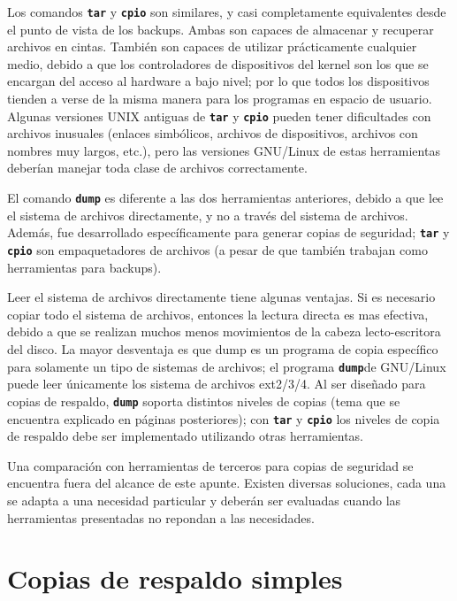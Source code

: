 ﻿\documentclass[12pt]{article}
\begin{document}
Los comandos \texttt{\textbf{tar}} y \texttt{\textbf{cpio}}
son similares, y casi completamente equivalentes desde el punto de 
vista de los backups. Ambas son capaces de almacenar y recuperar 
archivos en cintas. También son capaces de utilizar 
prácticamente cualquier medio, debido a que los controladores de 
dispositivos del kernel son los que se encargan del acceso al hardware a 
bajo nivel; por lo que todos los dispositivos
tienden a verse de la misma manera para los programas en espacio de usuario.
Algunas versiones  UNIX antiguas de \texttt{\textbf{tar}} y 
\texttt{\textbf{cpio}} pueden tener dificultades con archivos inusuales 
(enlaces simbólicos, archivos de dispositivos, archivos con nombres
muy largos, etc.), pero las versiones GNU/Linux de estas herramientas 
deberían manejar toda clase de archivos correctamente.

El comando \texttt{\textbf{dump}} es diferente a las dos herramientas 
anteriores, debido a que lee el sistema de archivos directamente, y no a 
través del sistema de archivos.  Además, fue desarrollado específicamente 
para generar copias de seguridad; \texttt{\textbf{tar}} y 
\texttt{\textbf{cpio}} son empaquetadores de archivos 
(a pesar de que también trabajan como herramientas para backups).

Leer el sistema de archivos directamente tiene algunas ventajas.
Si es necesario copiar todo el sistema de archivos, entonces la lectura 
directa es mas efectiva, debido a que se realizan muchos menos movimientos 
de la cabeza lecto-escritora del disco. La mayor desventaja es que dump es 
un programa de copia específico para solamente un tipo de sistemas de 
archivos; el programa \texttt{\textbf{dump}}de GNU/Linux puede leer 
únicamente los sistema de archivos ext2/3/4. Al ser diseñado para copias
de respaldo, \texttt{\textbf{dump}} soporta distintos niveles de copias
 (tema que se encuentra explicado en páginas posteriores); con 
\texttt{\textbf{tar}} y \texttt{\textbf{cpio}} los niveles de copia de 
respaldo debe ser implementado utilizando otras herramientas.

Una comparación con herramientas de terceros para copias de seguridad se 
encuentra fuera del alcance de este apunte. Existen diversas soluciones, 
cada una se adapta a una necesidad particular y deberán ser evaluadas 
cuando las herramientas presentadas no repondan a las necesidades. 

\section{Copias de respaldo simples}
\end{document}
